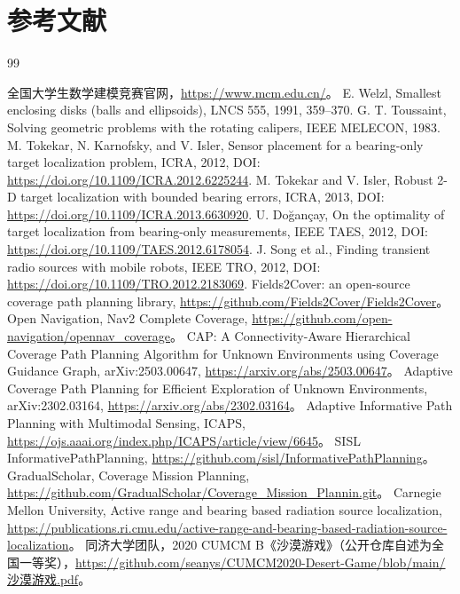 \section*{参考文献}
\sloppy
\begin{thebibliography}{99}\small\raggedright
{}全国大学生数学建模竞赛官网，\url{https://www.mcm.edu.cn/}。
E. Welzl, Smallest enclosing disks (balls and ellipsoids), LNCS 555, 1991, 359--370.
G. T. Toussaint, Solving geometric problems with the rotating calipers, IEEE MELECON, 1983.
M. Tokekar, N. Karnofsky, and V. Isler, Sensor placement for a bearing-only target localization problem, ICRA, 2012, DOI: \url{https://doi.org/10.1109/ICRA.2012.6225244}.
M. Tokekar and V. Isler, Robust 2-D target localization with bounded bearing errors, ICRA, 2013, DOI: \url{https://doi.org/10.1109/ICRA.2013.6630920}.
U. Doğançay, On the optimality of target localization from bearing-only measurements, IEEE TAES, 2012, DOI: \url{https://doi.org/10.1109/TAES.2012.6178054}.
J. Song et al., Finding transient radio sources with mobile robots, IEEE TRO, 2012, DOI: \url{https://doi.org/10.1109/TRO.2012.2183069}.
Fields2Cover: an open-source coverage path planning library, \url{https://github.com/Fields2Cover/Fields2Cover}。
Open Navigation, Nav2 Complete Coverage, \url{https://github.com/open-navigation/opennav_coverage}。
CAP: A Connectivity-Aware Hierarchical Coverage Path Planning Algorithm for Unknown Environments using Coverage Guidance Graph, arXiv:2503.00647, \url{https://arxiv.org/abs/2503.00647}。
Adaptive Coverage Path Planning for Efficient Exploration of Unknown Environments, arXiv:2302.03164, \url{https://arxiv.org/abs/2302.03164}。
Adaptive Informative Path Planning with Multimodal Sensing, ICAPS, \url{https://ojs.aaai.org/index.php/ICAPS/article/view/6645}。
SISL InformativePathPlanning, \url{https://github.com/sisl/InformativePathPlanning}。
GradualScholar, Coverage Mission Planning, \url{https://github.com/GradualScholar/Coverage_Mission_Plannin.git}。
Carnegie Mellon University, Active range and bearing based radiation source localization, \url{https://publications.ri.cmu.edu/active-range-and-bearing-based-radiation-source-localization}。
同济大学团队，2020 CUMCM B《沙漠游戏》（公开仓库自述为全国一等奖），\url{https://github.com/seanys/CUMCM2020-Desert-Game/blob/main/沙漠游戏.pdf}。

\end{thebibliography}
